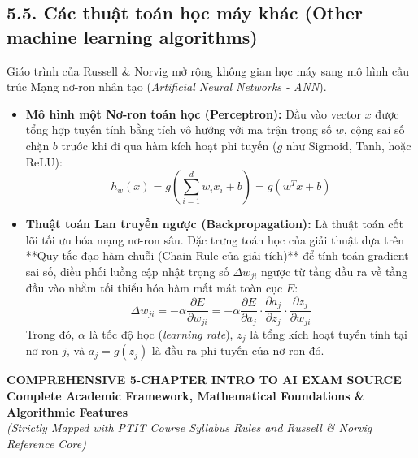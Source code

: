 \documentclass[11pt,a4paper]{article}
\begin{document}
\subsection{5.5. Các thuật toán học máy khác (Other machine learning algorithms)}
Giáo trình của Russell \& Norvig mở rộng không gian học máy sang mô hình cấu trúc Mạng nơ-ron nhân tạo (\textit{Artificial Neural Networks - ANN}).
\begin{itemize}
    \item \textbf{Mô hình một Nơ-ron toán học (Perceptron):} Đầu vào vector $x$ được tổng hợp tuyến tính bằng tích vô hướng với ma trận trọng số $w$, cộng sai số chặn $b$ trước khi đi qua hàm kích hoạt phi tuyến ($g$ như Sigmoid, Tanh, hoặc ReLU):
    \begin{equation}
        h_w(x) = g\left( \sum_{i=1}^{d} w_i x_i + b \right) = g(w^T x + b)
    \end{equation}
    \item \textbf{Thuật toán Lan truyền ngược (Backpropagation):} Là thuật toán cốt lõi tối ưu hóa mạng nơ-ron sâu. Đặc trưng toán học của giải thuật dựa trên **Quy tắc đạo hàm chuỗi (Chain Rule của giải tích)** để tính toán gradient sai số, điều phối luồng cập nhật trọng số $\Delta w_{ji}$ ngược từ tầng đầu ra về tầng đầu vào nhằm tối thiểu hóa hàm mất mát toàn cục $E$:
    \begin{equation}
        \Delta w_{ji} = -\alpha \frac{\partial E}{\partial w_{ji}} = -\alpha \frac{\partial E}{\partial a_j} \cdot \frac{\partial a_j}{\partial z_j} \cdot \frac{\partial z_j}{\partial w_{ji}}
    \end{equation}
    Trong đó, $\alpha$ là tốc độ học (\textit{learning rate}), $z_j$ là tổng kích hoạt tuyến tính tại nơ-ron $j$, và $a_j = g(z_j)$ là đầu ra phi tuyến của nơ-ron đó.
\end{itemize}


\newpage
{}

\begin{center}
    \textbf{\LARGE COMPREHENSIVE 5-CHAPTER INTRO TO AI EXAM SOURCE} \\
    \vspace{0.2cm}
    \textbf{\LARGE Complete Academic Framework, Mathematical Foundations \& Algorithmic Features} \\
    \textit{(Strictly Mapped with PTIT Course Syllabus Rules and Russell \& Norvig Reference Core)}
\end{center}
\end{document}
